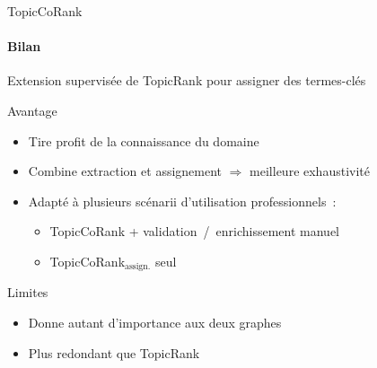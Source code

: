 \begin{frame}{TopicCoRank}\framesubtitle{Bilan}
  Extension supervisée de TopicRank pour assigner des termes-clés

  \vspace{1em}

  \begin{block}{Avantage}
    \begin{itemize}
      \item{Tire profit de la connaissance du domaine}
      \item{Combine extraction et assignement $\Rightarrow$ meilleure
            exhaustivité}
      \item{Adapté à plusieurs scénarii d'utilisation professionnels~:}
      \begin{itemize}
        \item{TopicCoRank + validation~/~enrichissement manuel}
        \item{TopicCoRank$_\text{assign.}$ seul}
      \end{itemize}
    \end{itemize}
  \end{block}

  \vspace{1em}

  \begin{alertblock}{Limites}
    \begin{itemize}
      \item{Donne autant d'importance aux deux graphes}
      \item{Plus redondant que TopicRank}
    \end{itemize}
  \end{alertblock}
\end{frame}

